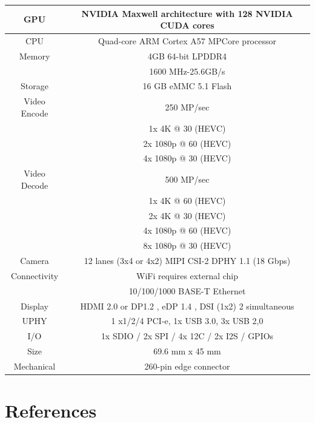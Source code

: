 \documentclass[12pt,letterpaper]{article}
\begin{document}
\begin{tabular}{|c | c|}
    \hline
    GPU & NVIDIA Maxwell architecture with 128 NVIDIA CUDA cores \\
    \hline
    CPU & Quad-core ARM Cortex A57 MPCore processor \\
    \hline
    Memory & 4GB 64-bit LPDDR4 \\
           & 1600 MHz-25.6GB/s \\
    \hline
    Storage & 16 GB eMMC 5.1 Flash \\
    \hline
    Video Encode & 250 MP/sec \\
                 & 1x 4K @ 30 (HEVC) \\
                 & 2x 1080p @ 60 (HEVC) \\
                 & 4x 1080p @ 30 (HEVC) \\
    \hline
    Video Decode & 500 MP/sec \\
                 & 1x 4K @ 60 (HEVC) \\
                 & 2x 4K @ 30 (HEVC) \\
                 & 4x 1080p @ 60 (HEVC) \\
                 & 8x 1080p @ 30 (HEVC) \\
    \hline
    Camera & 12 lanes (3x4 or 4x2) MIPI CSI-2 DPHY 1.1 (18 Gbps) \\
    \hline
    Connectivity & WiFi requires external chip \\
                 & 10/100/1000 BASE-T Ethernet \\
    \hline
    Display & HDMI 2.0 or DP1.2 , eDP 1.4 , DSI (1x2) 2 simultaneous \\
    \hline
    UPHY & 1 x1/2/4 PCI-e, 1x USB 3.0, 3x USB 2,0 \\
    \hline
    I/O & 1x SDIO / 2x SPI / 4x 12C / 2x I2S / GPIOs \\
    \hline
    Size & 69.6 mm x 45 mm \\
    \hline
    Mechanical & 260-pin edge connector \\
    \hline
\end{tabular}

\pagebreak



\section*{References}
\label{sec:refer}
\end{document}
